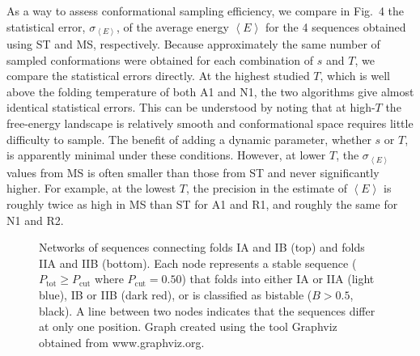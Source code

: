 \documentclass[
aip,
rsi,%
amsmath,amssymb,
reprint,%
]{revtex4-1}
\newcommand	 {\sbar}	{{s}}
\newcommand	 {\kb}		{{k_\mathrm{B}}}
\newcommand {\Pcut}     	{{P_\mathrm{cut}}}
\newcommand {\Ptot}	{{P_\mathrm{tot}}}
\newcommand {\sigE}	{{\sigma_{\left < E \right >}}}
\begin{document}
As a way to assess conformational sampling efficiency, we compare in Fig.~4 the statistical error, $\sigE$, of the average energy $\left <E\right >$ for the 4 sequences obtained using ST and MS, respectively. Because approximately the same number of sampled conformations were obtained for each combination of $\sbar$ and $T$, we compare the statistical errors directly. At the highest studied $T$, which is well above the folding temperature of both A1 and N1, the two algorithms give almost identical statistical errors. This can be understood by noting that at high-$T$ the free-energy landscape is relatively smooth and conformational space requires little difficulty to sample. The benefit of adding a dynamic parameter, whether $\sbar$ or $T$, is apparently minimal under these conditions. However, at lower $T$, the $\sigE$ values from MS is often smaller than those from ST and never significantly higher. For example, at the lowest $T$, the precision in the estimate of $\left < E\right >$ is roughly twice as high in MS than ST for A1 and R1, and roughly the same for N1 and R2. 



\begin{figure}
\caption{Networks of sequences connecting folds IA and IB (top) and folds IIA and IIB (bottom). Each node represents a stable sequence ($\Ptot\ge\Pcut$ where $\Pcut=0.50$) that folds into either IA or IIA (light blue), IB or IIB (dark red), or is classified as bistable ($B>0.5$, black). A line between two nodes indicates that the sequences differ at only one position. Graph created using the tool Graphviz~\protect\cite{Graphviz2000} obtained from  www.graphviz.org.}
\end{figure}

\vspace{12pt}
\end{document}
